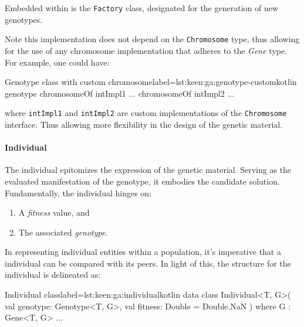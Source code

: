     Embedded within is the \texttt{Factory} class, designated for the 
    generation of new genotypes.

    Note this implementation does not depend on the \texttt{Chromosome} type,
    thus allowing for the use of any chromosome implementation that adheres to
    the \textit{Gene} type. For example, one could have:

    \begin{code}{Genotype class with custom chromosome}{label={lst:keen:ga:genotype-custom}}{kotlin}
      genotype {
          chromosomeOf {
              intImpl1 { ... }
          }
          chromosomeOf {
              intImpl2 { ... }
          }
      }
    \end{code}

    \noindent where \texttt{intImpl1} and \texttt{intImpl2} are custom 
    implementations of the \texttt{Chromosome} interface.
    Thus allowing more flexibility in the design of the genetic material.

  \paragraph{Individual}
    The individual epitomizes the expression of the genetic material.
    Serving as the evaluated manifestation of the genotype, it embodies the 
    candidate solution.
    Fundamentally, the individual hinges on:
    \begin{enumerate}
        \item A \textit{fitness} value, and
        \item The associated \textit{genotype}.
    \end{enumerate}
    
    In representing individual entities within a population, it's imperative 
    that a individual can be compared with its peers. 
    In light of this, the structure for the individual is delineated as:
    
    \begin{code}{Individual class}{label={lst:keen:ga:individual}}{kotlin}
      data class Individual<T, G>(
        val genotype: Genotype<T, G>,
        val fitness: Double = Double.NaN
      ) where G : Gene<T, G> { ... }
    \end{code}

